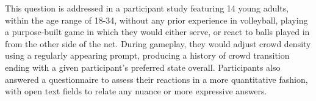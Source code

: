 This question is addressed in a participant study featuring 14 young adults, within the age range of 18-34, without any prior experience in volleyball, playing a purpose-built game in which they would either serve, or react to balls played in from the other side of the net. During gameplay, they would adjust crowd density using a regularly appearing prompt, producing a history of crowd transition ending with a given participant's preferred state overall. Participants also answered a questionnaire to assess their reactions in a more quantitative fashion, with open text fields to relate any nuance or more expressive answers.